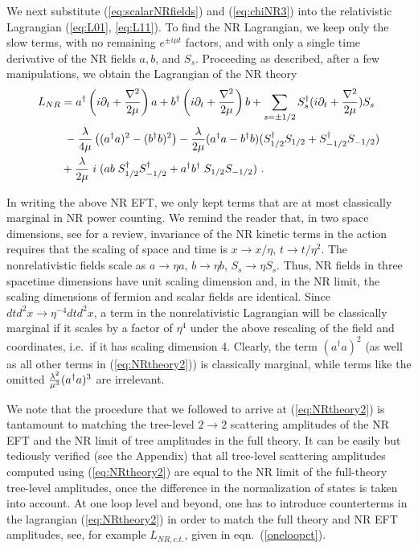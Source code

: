 \documentclass[11pt]{article}
\begin{document}
We next substitute (\ref{eq:scalarNRfields}) and (\ref{eq:chiNR3}) into the relativistic Lagrangian (\ref{eq:L01}, \ref{eq:L11}). To find the NR Lagrangian, we keep only the slow terms, with no remaining $e^{\pm i \mu t}$ factors, and with only a single time derivative of the NR fields $a, b$, and  $S_{s}$. 
Proceeding as described, after a few  manipulations, we obtain the Lagrangian of the NR theory \begin{align}
 \label{eq:NRtheory2}
 L_{NR} &=     {a}^\dagger  \left(i \partial_t + {\nabla^2 \over 2 \mu}\right)  {a} +  {b}^\dagger \left(i \partial_t + {\nabla^2 \over 2 \mu}\right)   {b} + \sum_{s = \pm 1/2} S^\dagger_s (i \partial_t + {\nabla^2 \over 2 \mu}) S_s  \nonumber \\
 & \;   -   {\lambda \over  4 \mu} \left(  
 ({a}^\dagger  {a})^2 - ({b}^\dagger  {b})^2 \right) - {\lambda \over 2 \mu}(a^\dagger a - b^\dagger b)(S_{1/2}^\dagger S_{1/2} +S_{-1/2}^\dagger S_{-1/2}) \\
 & + {\lambda   \over 2 \mu}\; i\; ( a b \; S_{1/2}^\dagger S^\dagger_{-1/2} + a^\dagger b^\dagger \;S_{1/2} S_{-1/2})~.\nonumber
 \end{align}
 
 In writing the above NR EFT, we only kept terms that are at most classically marginal in NR power counting. We remind the reader that, in two space dimensions, see \cite{Kaplan:2005es} for a review, invariance of the NR kinetic terms in the action requires that the scaling of space and time is $x \rightarrow  x/\eta$, $t \rightarrow  t/\eta^2$. The nonrelativistic fields scale as $a \rightarrow \eta a$, $b \rightarrow \eta b$, $S_s \rightarrow \eta S_s$. Thus,  NR  fields in three spacetime dimensions have unit scaling dimension and, in the NR limit, the scaling dimensions of   fermion and scalar  fields are identical.  
 Since $dt d^2 x \rightarrow \eta^{-4} dt d^2 x$, a term in the nonrelativistic Lagrangian will be classically marginal if it scales by a factor of $\eta^{4}$ under the above rescaling of the field and coordinates, i.e.~if it has scaling dimension 4.   Clearly, the term $(a^\dagger a)^2$ (as well as all other terms in  (\ref{eq:NRtheory2})) is classically marginal, while terms like the omitted   ${\lambda^2 \over \mu^3}
  (a^\dagger a)^3$ are irrelevant. 
  
  We note that the procedure that we followed to arrive at (\ref{eq:NRtheory2})  is tantamount to matching the tree-level $2\rightarrow 2$ scattering amplitudes of the NR EFT and the NR limit of tree amplitudes in the full theory. It can be easily but tediously  verified (see the Appendix) that all tree-level scattering amplitudes computed using (\ref{eq:NRtheory2}) are equal to the NR limit of the full-theory tree-level amplitudes, once the difference in the normalization of states is taken into account.
At one loop level and beyond, one has to introduce counterterms in the lagrangian (\ref{eq:NRtheory2}) in order to match the full theory and NR EFT amplitudes, see, for example   $L_{NR, c.t.}$, given in eqn.~(\ref{oneloopct}).
\end{document}
